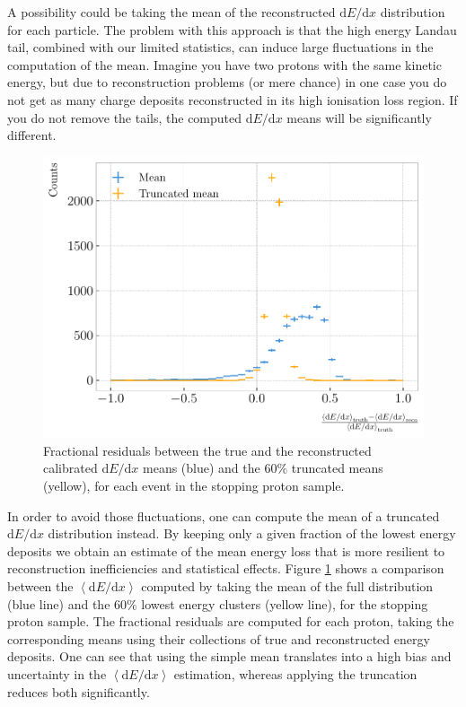 A possibility could be taking the mean of the reconstructed $\mathrm{d}E/\mathrm{d}x$ distribution for each particle. The problem with this approach is that the high energy Landau tail, combined with our limited statistics, can induce large fluctuations in the computation of the mean. Imagine you have two protons with the same kinetic energy, but due to reconstruction problems (or mere chance) in one case you do not get as many charge deposits reconstructed in its high ionisation loss region. If you do not remove the tails, the computed $\mathrm{d}E/\mathrm{d}x$ means will be significantly different.

\begin{figure}[t]
	\centering
	\includegraphics[width=.70\linewidth]{Images/GArSoft_PID/dEdx/reco_dEdx_truncation_comp_alt.pdf}
	\caption[Fractional residuals between the true and the reconstructed calibrated $\mathrm{d}E/\mathrm{d}x$ means and the $60\%$ truncated means.]{Fractional residuals between the true and the reconstructed calibrated $\mathrm{d}E/\mathrm{d}x$ means (blue) and the $60\%$ truncated means (yellow), for each event in the stopping proton sample.}
	\label{fig:energy_trucation_comp}
\end{figure}

In order to avoid those fluctuations, one can compute the mean of a truncated $\mathrm{d}E/\mathrm{d}x$ distribution instead. By keeping only a given fraction of the lowest energy deposits we obtain an estimate of the mean energy loss that is more resilient to reconstruction inefficiencies and statistical effects. Figure \ref{fig:energy_trucation_comp} shows a comparison between the $\left<\mathrm{d}E/\mathrm{d}x\right>$ computed by taking the mean of the full distribution (blue line) and the $60\%$ lowest energy clusters (yellow line), for the stopping proton sample. The fractional residuals are computed for each proton, taking the corresponding means using their collections of true and reconstructed energy deposits. One can see that using the simple mean translates into a high bias and uncertainty in the $\left<\mathrm{d}E/\mathrm{d}x\right>$ estimation, whereas applying the truncation reduces both significantly.

